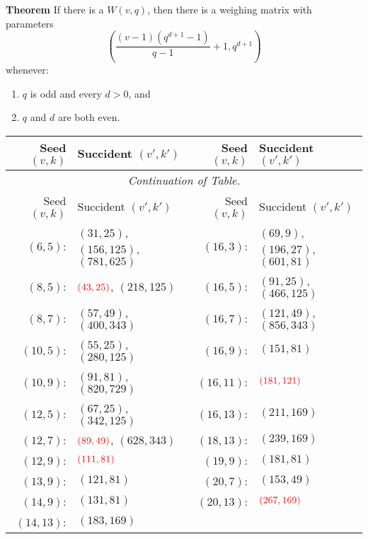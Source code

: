 \documentclass{beamer}
\newcommand{\rred}[1]{\textcolor{red}{#1}}
\begin{document}
\begin{frame}

  \begin{block}{{\bf Theorem} \cite[][]{w-mat-construct}}
    If there is a $W(v,q)$, then there is a weighing matrix with parameters
    \[
      \left(
        \frac{(v-1)(q^{d+1}-1)}{q-1}+1, q^{d+1}
      \right)
    \]
    whenever:
    \begin{enumerate}
    \item $q$ is odd and every $d>0$, and
    \item $q$ and $d$ are both even.
    \end{enumerate}
  \end{block}
  
\end{frame}

\begin{frame}

  \begin{scriptsize}
    \begin{longtable}[c]{rl|rl}

      Seed $(v,k)$ & Succident $(v',k')$ & Seed $(v,k)$ & Succident $(v',k')$ \\
      \hline
      \endfirsthead

      \multicolumn{4}{c}{\it Continuation of Table.}\\
      Seed $(v,k)$ & Succident $(v',k')$ & Seed $(v,k)$ & Succident $(v',k')$ \\
      \hline
      \endhead

      \endfoot

      $(6,5)$: & $(31,25)$, $(156,125)$, $(781,625)$ & $(16,3)$: & $(69,9)$, $(196,27)$, $(601,81)$ \\
      $(8,5)$: & $\rred{(43,25)}$, $(218,125)$ & $(16,5)$: & $(91,25)$, $(466,125)$ \\
      $(8,7)$: & $(57,49)$, $(400,343)$ & $(16,7)$: & $(121,49)$, $(856,343)$ \\
      $(10,5)$: & $(55,25)$, $(280,125)$ & $(16,9)$: & $(151,81)$ \\
      $(10,9)$: & $(91,81)$, $(820,729)$ & $(16,11)$: & $\rred{(181,121)}$ \\
      $(12,5)$: & $(67,25)$, $(342,125)$ & $(16,13)$: & $(211,169)$ \\
      $(12,7)$: & $\rred{(89,49)}$, $(628,343)$ & $(18,13)$: & $(239,169)$ \\
      $(12,9)$: & $\rred{(111,81)}$ & $(19,9)$: & $(181,81)$ \\
      $(13,9)$: & $(121,81)$ & $(20,7)$: & $(153,49)$ \\
      $(14,9)$: & $(131,81)$ & $(20,13)$: & $\rred{(267,169)}$ \\
      $(14,13)$: & $(183,169)$ & & \\

    \end{longtable}
  \end{scriptsize}
  
\end{frame}
\end{document}
